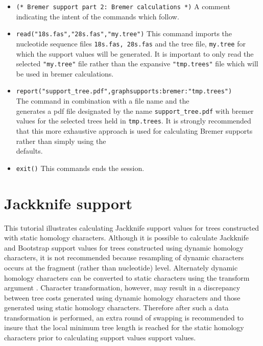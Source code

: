 \begin{itemize}
\item \texttt{(* Bremer support part 2: Bremer calculations *)}  A comment indicating the intent of the commands 
which follow.
\item \texttt{read("18s.fas","28s.fas","my.tree")} This command imports the nucleotide sequence files 
\texttt{18s.fas, 28s.fas} and the tree file, \texttt{my.tree} for which the support values will be generated.  It is 
important to only read the selected \texttt{"my.tree"} file rather than the expansive  \texttt{"tmp.trees"} file which 
will be used in bremer calculations.
\item \texttt{report("support\_tree.pdf",graphsupports:bremer:"tmp.trees")} \\The {} command 
in combination with a file name and the \\  generates a pdf file designated by the 
name \texttt{support\_tree.pdf} with bremer values for the selected trees held in \texttt{tmp.trees}.  It is strongly 
recommended that this more exhaustive approach is used for calculating Bremer supports rather than simply 
using the \\  defaults.  
\item \texttt{exit()} This commands ends the \poy session.
\end{itemize}

\section{Jackknife support}{\label{tutorial 4}}

This tutorial illustrates calculating Jackknife support values for trees constructed with static homology characters.  
Although it is possible to calculate Jackknife and Bootstrap support values 
for trees constructed using dynamic homology characters, it is not recommended because resampling of 
dynamic characters occurs at the fragment (rather than nucleotide) level. Alternately dynamic homology 
characters can be converted to static characters using the transform argument .  
Character transformation, however, may result in a discrepancy between tree costs generated using dynamic 
homology characters and those generated using static homology characters. Therefore after such a data 
transformation is performed, an extra round of swapping is recommended to insure that the local minimum tree 
length is reached for the static homology characters prior to calculating support values  support values.

